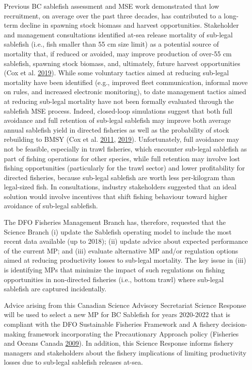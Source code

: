\documentclass[11pt]{book}
\begin{document}
Previous BC sablefish assessment and MSE work demonstrated that low recruitment, on average over the past three decades, has contributed to a long-term decline in spawning stock biomass and harvest opportunities. Stakeholder and management consultations identified at-sea release mortality of sub-legal sablefish (i.e., fish smaller than 55 cm size limit) as a potential source of mortality that, if reduced or avoided, may improve production of over-55 cm sablefish, spawning stock biomass, and, ultimately, future harvest opportunities (Cox et al. \protect\hyperlink{ref-cox2019evaluating}{2019}). While some voluntary tactics aimed at reducing sub-legal mortality have been identified (e.g., improved fleet communication, informal move on rules, and increased electronic monitoring), to date management tactics aimed at reducing sub-legal mortality have not been formally evaluated through the sablefish MSE process. Indeed, closed-loop simulations suggest that both full avoidance and full retention of sub-legal sablefish may improve both average annual sablefish yield in directed fisheries as well as the probability of stock rebuilding to BMSY (Cox et al. \protect\hyperlink{ref-cox2011management}{2011}, \protect\hyperlink{ref-cox2019evaluating}{2019}). Unfortunately, full avoidance may not be feasible, especially in trawl fisheries, which encounter sub-legal sablefish as part of fishing operations for other species, while full retention may involve lost fishing opportunities (particularly for the trawl sector) and lower profitability for directed fisheries, because sub-legal sablefish are worth less per-kilogram than legal-sized fish. In consultations, industry stakeholders suggested that an ideal solution would involve incentives that shift fishing behaviour toward higher avoidance of sub-legal sablefish.

The DFO Fisheries Management Branch has, therefore, requested that the Science Branch (i) update the Sablefish operating model to include the most recent data available (up to 2018); (ii) update advice about expected performance of the current MP; and (iii) evaluate alternative MP and/or regulation options aimed at reducing productivity losses to sub-legal mortality. The key issue in (iii) is identifying MPs that minimize the impact of such regulations on fishing opportunities in non-directed fisheries (i.e., bottom trawl) where sub-legal sablefish are captured incidentally.

Advice arising from this Canadian Science Advisory Secretariat Science Response will be used to select a new MP for BC Sablefish for years 2020-2022 that is compliant with the DFO Sustainable Fisheries Framework and A fishery decision-making framework incorporating the Precautionary Approach policy (Fisheries and Oceans Canada \protect\hyperlink{ref-DFO2009}{2009}). In addition, this Science Response informs fishery managers and stakeholders about the fishery implications of limiting productivity losses due to sub-legal sablefish releases at-sea.
\end{document}
